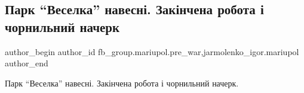  
 
 
 
 

\subsection{Парк \enquote{Веселка} навесні. Закінчена робота і чорнильний начерк}
\label{sec:09_01_2023.fb.fb_group.mariupol.pre_war.4.park__veselka__naves}
 
\ifcmt
 author_begin
   author_id fb_group.mariupol.pre_war,jarmolenko_igor.mariupol
 author_end
\fi

Парк \enquote{Веселка} навесні. Закінчена робота і чорнильний начерк.
